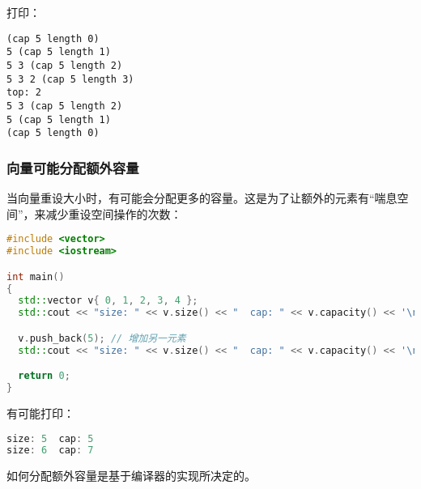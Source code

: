 \documentclass[../../LearnCpp.tex]{subfiles}
\begin{document}
打印：

\begin{lstlisting}
(cap 5 length 0)
5 (cap 5 length 1)
5 3 (cap 5 length 2)
5 3 2 (cap 5 length 3)
top: 2
5 3 (cap 5 length 2)
5 (cap 5 length 1)
(cap 5 length 0)
\end{lstlisting}

\subsubsection*{向量可能分配额外容量}

当向量重设大小时，有可能会分配更多的容量。这是为了让额外的元素有“喘息空间”，来减少重设空间操作的次数：

\begin{lstlisting}[language=C++]
#include <vector>
#include <iostream>

int main()
{
  std::vector v{ 0, 1, 2, 3, 4 };
  std::cout << "size: " << v.size() << "  cap: " << v.capacity() << '\n';

  v.push_back(5); // 增加另一元素
  std::cout << "size: " << v.size() << "  cap: " << v.capacity() << '\n';

  return 0;
}
\end{lstlisting}

有可能打印：

\begin{lstlisting}[language=C++]
size: 5  cap: 5
size: 6  cap: 7
\end{lstlisting}

如何分配额外容量是基于编译器的实现所决定的。
\end{document}
